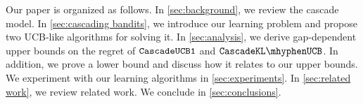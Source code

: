 Our paper is organized as follows. In \cref{sec:background}, we review the cascade model. In \cref{sec:cascading bandits}, we introduce our learning problem and propose two UCB-like algorithms for solving it. In \cref{sec:analysis}, we derive gap-dependent upper bounds on the regret of ${\tt CascadeUCB1}$ and $\cascadeklucb$. In addition, we prove a lower bound and discuss how it relates to our upper bounds. We experiment with our learning algorithms in \cref{sec:experiments}. In \cref{sec:related work}, we review related work. We conclude in \cref{sec:conclusions}.
